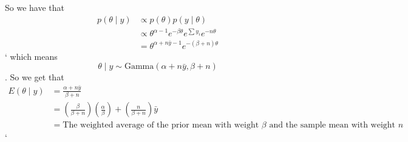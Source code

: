 \documentclass[a4paper]{article}
\begin{document}
So we have that 
\begin{align}
	p\left( \theta \mid y \right) &\propto p\left( \theta \right) p\left( y \mid \theta \right) \\
	&\propto \theta ^{\alpha - 1} e ^{-\beta \theta} e ^{\sum y_i} e^{-n \theta}\\
	&= \theta ^{\alpha + n \bar{y} - 1} e ^{-\left( \beta + n \right) \theta}
\end{align}`
which means
\begin{equation}
	\theta \mid y \sim \text{Gamma}\left( \alpha + n \bar{y}, \beta + n \right)
\end{equation}.
So we get that 
\begin{align}
	E\left( \theta \mid y \right) &= \frac{\alpha + n \bar{y}}{\beta + n}\\
	&= \left( \frac{\beta}{\beta + n} \right)\left( \frac{\alpha}{\beta} \right) + \left( \frac{n}{\beta + n} \right)\bar{y}\\
	&= \text{The weighted average of the prior mean with weight $\beta$ and the sample mean with weight $n$}
\end{align}`
\end{document}
